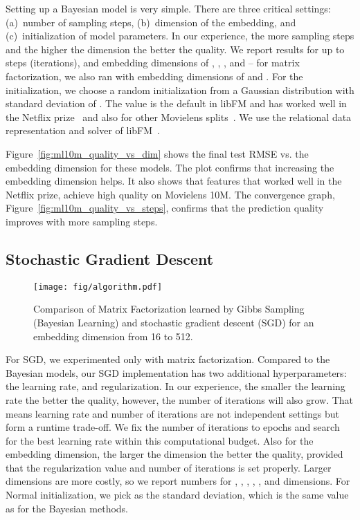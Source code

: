 \documentclass{article}
\begin{document}
Setting up a Bayesian model is very simple.
There are three critical settings: (a)~number of sampling steps, (b)~dimension of the embedding, and (c)~initialization of model parameters.
In our experience, the more sampling steps and the higher the dimension the better the quality.
We report results for up to  steps (iterations), and embedding dimensions of , , , and  -- for matrix factorization, we also ran with embedding dimensions of  and .
For the initialization, we choose a random initialization from a Gaussian distribution with standard deviation of .
The value  is the default in libFM and has worked well in the Netflix prize~\cite{rendle:vldb13} and also for other Movielens splits~\cite{yamada:kdd17}.
We use the relational data representation and solver of libFM~\cite{rendle:vldb13}.

Figure~\ref{fig:ml10m_quality_vs_dim} shows the final test RMSE vs. the embedding dimension for these models.
The plot confirms that increasing the embedding dimension helps.
It also shows that features that worked well in the Netflix prize, achieve high quality on Movielens 10M.
The convergence graph, Figure~\ref{fig:ml10m_quality_vs_steps}, confirms that the prediction quality improves with more sampling steps.



\subsection{Stochastic Gradient Descent}

\begin{figure}[t]
    \centering
    \texttt{[image: fig/algorithm.pdf]}
    \caption{Comparison of Matrix Factorization learned by Gibbs Sampling (Bayesian Learning) and stochastic gradient descent (SGD) for an embedding dimension from 16 to 512.}
    \label{fig:ml10m_algorithm}
\end{figure}
For SGD, we experimented only with matrix factorization.
Compared to the Bayesian models, our SGD implementation has two additional hyperparameters: the learning rate, and regularization.
In our experience, the smaller the learning rate the better the quality, however, the number of iterations will also grow.
That means learning rate and number of iterations are not independent settings but form a runtime trade-off.
We fix the number of iterations to  epochs and search for the best learning rate within this computational budget.
Also for the embedding dimension, the larger the dimension the better the quality, provided that the regularization value and number of iterations is set properly.
Larger dimensions are more costly, so we report numbers for , , , , , and  dimensions.
For Normal initialization, we pick  as the standard deviation, which is the same value as for the Bayesian methods.
\end{document}
